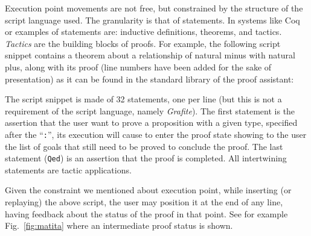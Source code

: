 Execution point movements are not free, but constrained by the structure of the
script language used. The granularity is that of statements. In systems like Coq
or \MATITA{} examples of statements are: inductive definitions, theorems, and
tactics. \emph{Tactics} are the building blocks of proofs. For example, the
following script snippet contains a theorem about a relationship of natural
minus with natural plus, along with its proof (line numbers have been added for
the sake of presentation) as it can be found in the standard library of the
\MATITA{} proof assistant:


The script snippet is made of 32 statements, one per line (but this is not a
requirement of the \MATITA{} script language, namely \emph{Grafite}). The first
statement is the assertion that the user want to prove a proposition with a
given type, specified after the ``\texttt{:}'', its execution will cause
\MATITA{} to enter the proof state showing to the user the list of goals that
still need to be proved to conclude the proof. The last statement (\texttt{Qed})
is an assertion that the proof is completed. All intertwining statements are
tactic applications.

Given the constraint we mentioned about execution point, while inserting (or
replaying) the above script, the user may position it at the end of any line,
having feedback about the status of the proof in that point. See for example
Fig.~\ref{fig:matita} where an intermediate proof status is shown.


